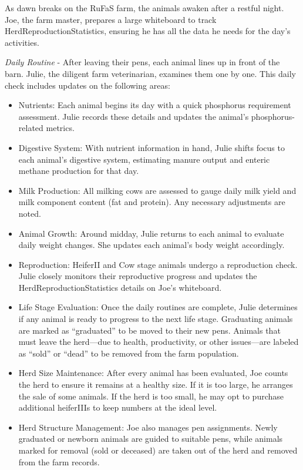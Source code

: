 \documentclass[
  letterpaper,
  DIV=11,
  numbers=noendperiod]{scrreprt}
\begin{document}
As dawn breaks on the RuFaS farm, the animals awaken after a restful
night. Joe, the farm master, prepares a large whiteboard to track
HerdReproductionStatistics, ensuring he has all the data he needs for
the day's activities.

\emph{Daily Routine} - After leaving their pens, each animal lines up in
front of the barn. Julie, the diligent farm veterinarian, examines them
one by one. This daily check includes updates on the following areas:

\begin{itemize}
\item
  Nutrients: Each animal begins its day with a quick phosphorus
  requirement assessment. Julie records these details and updates the
  animal's phosphorus-related metrics.
\item
  Digestive System: With nutrient information in hand, Julie shifts
  focus to each animal's digestive system, estimating manure output and
  enteric methane production for that day.
\item
  Milk Production: All milking cows are assessed to gauge daily milk
  yield and milk component content (fat and protein). Any necessary
  adjustments are noted.
\item
  Animal Growth: Around midday, Julie returns to each animal to evaluate
  daily weight changes. She updates each animal's body weight
  accordingly.
\item
  Reproduction: HeiferII and Cow stage animals undergo a reproduction
  check. Julie closely monitors their reproductive progress and updates
  the HerdReproductionStatistics details on Joe's whiteboard.
\item
  Life Stage Evaluation: Once the daily routines are complete, Julie
  determines if any animal is ready to progress to the next life stage.
  Graduating animals are marked as ``graduated'' to be moved to their
  new pens. Animals that must leave the herd---due to health,
  productivity, or other issues---are labeled as ``sold'' or ``dead'' to
  be removed from the farm population.
\item
  Herd Size Maintenance: After every animal has been evaluated, Joe
  counts the herd to ensure it remains at a healthy size. If it is too
  large, he arranges the sale of some animals. If the herd is too small,
  he may opt to purchase additional heiferIIIs to keep numbers at the
  ideal level.
\item
  Herd Structure Management: Joe also manages pen assignments. Newly
  graduated or newborn animals are guided to suitable pens, while
  animals marked for removal (sold or deceased) are taken out of the
  herd and removed from the farm records.
\end{itemize}
\end{document}
